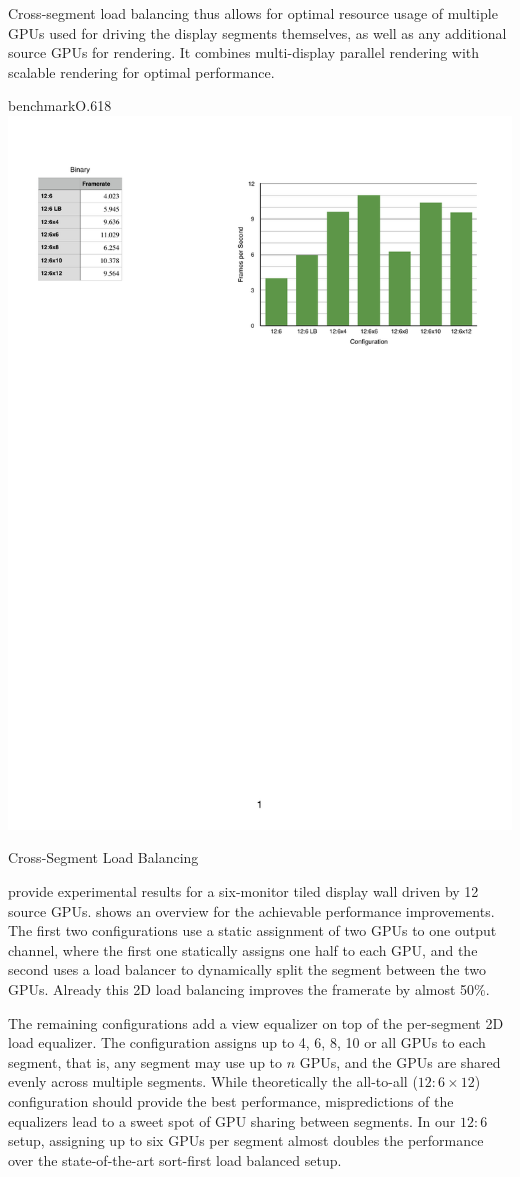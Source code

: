 Cross-segment load balancing thus allows for optimal resource usage of multiple
GPUs used for driving the display segments themselves, as well as any additional
source GPUs for rendering. It combines multi-display parallel rendering with
scalable rendering for optimal performance.

\begin{wrapfloat}{benchmark}{O}{.618\textwidth}
  \includegraphics[width=.618\textwidth]{results/cslbFPS}
  \caption{\label{rCSLBFPS}Cross-Segment Load Balancing}
\end{wrapfloat}

\cite{EEP:11} provide experimental results for a six-monitor tiled display wall
driven by 12 source GPUs.  shows an overview for the achievable
performance improvements. The first two configurations use a static assignment
of two GPUs to one output channel, where the first one statically assigns one
half to each GPU, and the second uses a load balancer to dynamically split the
segment between the two GPUs. Already this 2D load balancing improves the
framerate by almost 50\%.

The remaining configurations add a view equalizer on top of the per-segment 2D
load equalizer. The configuration assigns up to 4, 6, 8, 10 or all GPUs to each
segment, that is, any segment may use up to $n$ GPUs, and the GPUs are shared
evenly across multiple segments. While theoretically the all-to-all
($12:6\times 12$) configuration should provide the best performance,
mispredictions of the equalizers lead to a sweet spot of GPU sharing between
segments. In our $12:6$ setup, assigning up to six GPUs per segment almost
doubles the performance over the state-of-the-art sort-first load balanced
setup.

